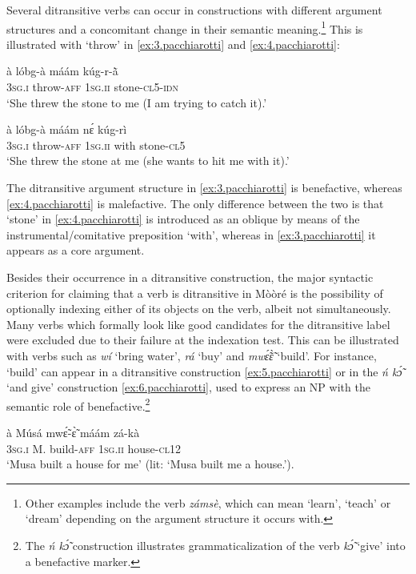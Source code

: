 \documentclass[output=paper]{langsci/langscibook}
\begin{document}
Several ditransitive verbs can occur in constructions with different argument structures and a concomitant change in their semantic meaning.\footnote{Other examples include the verb \textit{z\'{a}ms\`{e}}, which can mean `learn', `teach' or `dream' depending on the argument structure it occurs with.} This is illustrated with `throw' in \ref{ex:3.pacchiarotti} and \ref{ex:4.pacchiarotti}:  

\ea
\label{ex:3.pacchiarotti}
\gll \`{a}    l\'{o}bg-\`{a}    m\'{a}\'{a}m    k\'{u}g-r-\`{\~{a}}\\
\textsc{3sg.i}  throw-\textsc{aff}  \textsc{1sg.ii}  stone-\textsc{cl5-idn} \\
\glt `She threw the stone to me (I am trying to catch it).'  
\z

\ea
\label{ex:4.pacchiarotti}
\gll \`{a}    l\'{o}bg-\`{a}    m\'{a}\'{a}m    nɛ́  k\'{u}g-r\`{i} \\
\textsc{3sg.i  }  throw-\textsc{aff}  \textsc{1sg.ii  }  with  stone-\textsc{cl5} \\
\glt `She threw the stone at me (she wants to hit me with it).'
\z

The ditransitive argument structure in \ref{ex:3.pacchiarotti} is benefactive, whereas \ref{ex:4.pacchiarotti} is malefactive. The only difference between the two is that `stone' in \ref{ex:4.pacchiarotti} is introduced as an oblique by means of the instrumental/comitative preposition `with', whereas in \ref{ex:3.pacchiarotti} it appears as a core argument. 

Besides their occurrence in a ditransitive construction, the major syntactic criterion for claiming that a verb is ditransitive in M\`{o}\`{o}r\'{e} is the possibility of optionally indexing either of its objects on the verb, albeit not simultaneously. Many verbs which formally look like good candidates for the ditransitive label were excluded due to their failure at the indexation test. This can be illustrated with verbs such as \textit{w\'{i}} `bring water', \textit{r\'{a}} `buy' and \textit{mw\'{\~{ɛ}}\`{\~{ɛ}}} `build'. For instance, `build' can appear in a ditransitive construction \ref{ex:5.pacchiarotti} or in the \textit{\'{n} k\'{\~{ɔ}}} `and give' construction \ref{ex:6.pacchiarotti}, used to express an NP with the semantic role of benefactive.\footnote{The\textit{ \'{n} k\'{\~{ɔ}}} construction illustrates grammaticalization of the verb \textit{k\'{\~{ɔ}}} `give' into a benefactive marker.} 

\ea
\label{ex:5.pacchiarotti}
\gll \`{a}    M\'{u}s\'{a}  mwɛ̃́-ɛ̃̀    m\'{a}\'{a}m    z\'{a}-k\`{a} \\
\textsc{3sg.i  }  M.  build-\textsc{aff}  \textsc{1sg.ii  }  house-\textsc{cl12} \\
\glt `Musa built a house for me' (lit: `Musa built me a house.'). 
\z
\end{document}
